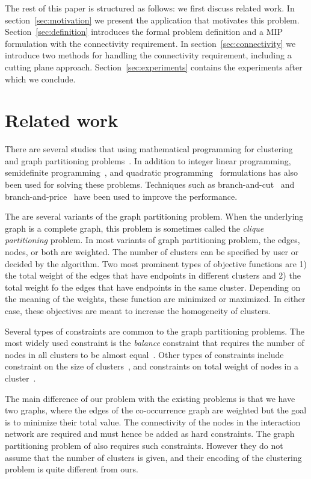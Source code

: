 \documentclass[conference]{IEEEtran}
\begin{document}
The rest of this paper is structured as follows: we first discuss related work. In
section~\ref{sec:motivation} we present the application that motivates
this problem.  Section~\ref{sec:definition} introduces the formal
problem definition and a MIP formulation with the connectivity requirement.
In section~\ref{sec:connectivity} we introduce two methods for handling the connectivity requirement, including a cutting plane approach. Section~\ref{sec:experiments} contains the experiments after which we conclude.


\section{Related work}
\label{sec:related}
There are several studies that using mathematical programming
for clustering and graph partitioning
problems~\cite{HansenJ97}. In addition to integer linear programming, semidefinite programming~\cite{ArmbrusterFHM08,LisserR03}, and quadratic programming~\cite{FanP10} formulations has also been used for solving these problems. Techniques such as branch-and-cut~\cite{FerreiraMSWW98,GrotschelW89} and branch-and-price~\cite{MehrotraT98,JiM07} have been used to improve the performance. 

The are several variants of the graph partitioning problem. When the underlying graph is a complete graph, this problem is sometimes called the \emph{clique partitioning} problem. In most variants of graph partitioning problem, the edges, nodes, or both are weighted. The number of clusters can be specified by user or decided by the algorithm. Two most prominent types of objective functions are 1) the total weight of the edges that have endpoints in different clusters and 2) the total weight fo the edges that have endpoints in the same cluster. Depending on the meaning of the weights, these function are minimized or maximized. In either case, these objectives are meant to increase the homogeneity of clusters.  

Several types of constraints are common to the graph partitioning problems. The most widely used constraint is the \emph{balance} constraint that requires the number of nodes in all clusters to be almost equal~\cite{LabbeO10}. Other types of constraints include constraint on the size of clusters~\cite{FanP10}, and constraints on total weight of nodes in a cluster~\cite{FerreiraMSWW98}. 

The main difference of our problem with the existing problems is that we have two graphs, where the edges of the co-occurrence graph are weighted but the goal is to minimize their total value. The connectivity of the nodes in the interaction network are required and must hence be added as hard constraints. The graph partitioning problem of \cite{Benati2017} also requires such constraints. However they do not assume that the number of clusters is given, and their encoding of the clustering problem is quite different from ours. 
\end{document}
